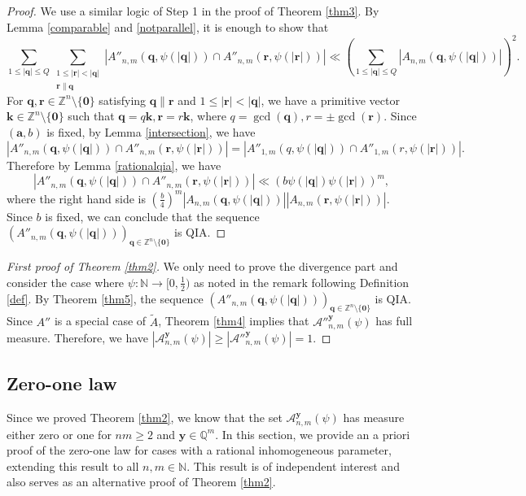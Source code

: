 \documentclass[reqno]{amsart}
\theoremstyle{definition}
\theoremstyle{remark}
\begin{document}
\begin{proof}
    We use a similar logic of Step 1 in the proof of Theorem \ref{thm3}. By Lemma \ref{comparable} and \ref{notparallel}, it is enough to show that
    $$\sum_{1\leq |\mathbf{q}| \leq Q} \sum_{\substack{1\leq |\mathbf{r}| < |\mathbf{q}| \\ \mathbf{r}\parallel \mathbf{q}}} \left|A''_{n,m}(\mathbf{q}, \psi(|\mathbf{q}|)) \cap A''_{n,m}(\mathbf{r}, \psi(|\mathbf{r}|))\right| \ll \left(\sum_{1\leq |\mathbf{q}| \leq Q} |A_{n,m}(\mathbf{q}, \psi(|\mathbf{q}|))| \right)^2.$$
    For $\mathbf{q}, \mathbf{r} \in \mathbb{Z}^n \setminus \{\mathbf{0}\}$ satisfying $\mathbf{q} \parallel \mathbf{r}$ and $1\leq |\mathbf{r}| < |\mathbf{q}|$, we have a primitive vector $\mathbf{k} \in \mathbb{Z}^n \setminus \{\mathbf{0}\}$ such that $\mathbf{q} = q\mathbf{k}, \mathbf{r} = r\mathbf{k}$, where $q=\gcd(\mathbf{q}), r=\pm \gcd(\mathbf{r})$. Since $(\mathbf{a}, b)$ is fixed, by Lemma \ref{intersection}, we have
    $$|A''_{n,m}(\mathbf{q}, \psi(|\mathbf{q}|)) \cap A''_{n,m}(\mathbf{r}, \psi(|\mathbf{r}|))| = |A''_{1,m}(q, \psi(|\mathbf{q}|)) \cap A''_{1,m}(r, \psi(|\mathbf{r}|))|.$$
    Therefore by Lemma \ref{rationalqia}, we have
    $$|A''_{n,m}(\mathbf{q}, \psi(|\mathbf{q}|)) \cap A''_{n,m}(\mathbf{r}, \psi(|\mathbf{r}|))| \ll \left(b\psi(|\mathbf{q}|)\psi(|\mathbf{r}|)\right)^m,$$
    where the right hand side is $(\frac{b}{4})^m |A_{n,m}(\mathbf{q}, \psi(|\mathbf{q}|))||A_{n,m}(\mathbf{r},\psi(|\mathbf{r}|))|.$ Since $b$ is fixed, we can conclude that the sequence $(A''_{n,m}(\mathbf{q}, \psi(|\mathbf{q}|)))_{\mathbf{q} \in \mathbb{Z}^n \setminus \{\mathbf{0}\}}$ is QIA.
\end{proof}
\begin{proof}[First proof of Theorem \ref{thm2}]
    We only need to prove the divergence part and consider the case where $\psi: \mathbb{N} \to [0,\frac{1}{2})$ as noted in the remark following Definition \ref{def}. By Theorem \ref{thm5}, the sequence $(A''_{n,m}(\mathbf{q}, \psi(|\mathbf{q}|)))_{\mathbf{q} \in \mathbb{Z}^n \setminus \{\mathbf{0}\}}$ is QIA. Since $A''$ is a special case of $\tilde A$, Theorem \ref{thm4} implies that $\mathscr{A}''^{\mathbf{y}}_{n,m}(\psi)$ has full measure. Therefore, we have $|\mathscr{A}^{\mathbf{y}}_{n,m}(\psi)| \geq |\mathscr{A}''^{\mathbf{y}}_{n,m}(\psi)| = 1.$
\end{proof}

\subsection{Zero-one law}
Since we proved Theorem \ref{thm2}, we know that the set $\mathscr{A}^{\mathbf{y}}_{n,m}(\psi)$ has measure either zero or one for $nm\geq 2$ and $\mathbf{y} \in \mathbb{Q}^m$. In this section, we provide an a priori proof of the zero-one law for cases with a rational inhomogeneous parameter, extending this result to all $n,m \in \mathbb{N}$. This result is of independent interest and also serves as an alternative proof of Theorem \ref{thm2}.
\end{document}
